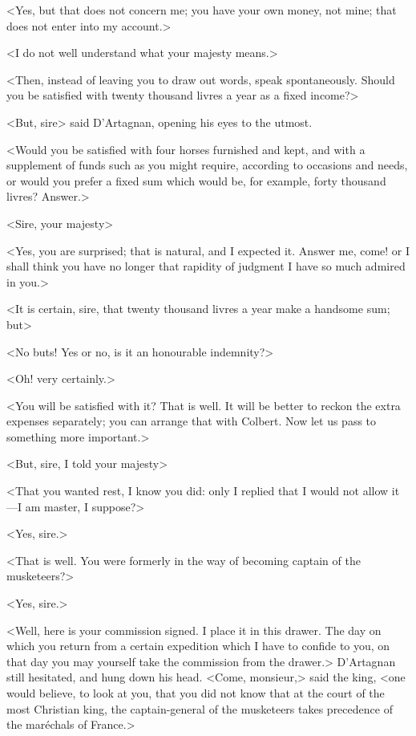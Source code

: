 <Yes, but that does not concern me; you have your own money, not mine; that does not enter into my account.>

<I do not well understand what your majesty means.>

<Then, instead of leaving you to draw out words, speak spontaneously. Should you be satisfied with twenty thousand livres a year as a fixed income?>

<But, sire> said D'Artagnan, opening his eyes to the utmost.

<Would you be satisfied with four horses furnished and kept, and with a supplement of funds such as you might require, according to occasions and needs, or would you prefer a fixed sum which would be, for example, forty thousand livres? Answer.>

<Sire, your majesty\longdash>

<Yes, you are surprised; that is natural, and I expected it. Answer me, come! or I shall think you have no longer that rapidity of judgment I have so much admired in you.>

<It is certain, sire, that twenty thousand livres a year make a handsome sum; but\longdash>

<No buts! Yes or no, is it an honourable indemnity?>

<Oh! very certainly.>

<You will be satisfied with it? That is well. It will be better to reckon the extra expenses separately; you can arrange that with Colbert. Now let us pass to something more important.>

<But, sire, I told your majesty\longdash>

<That you wanted rest, I know you did: only I replied that I would not allow it—I am master, I suppose?>

<Yes, sire.>

<That is well. You were formerly in the way of becoming captain of the musketeers?>

<Yes, sire.>

<Well, here is your commission signed. I place it in this drawer. The day on which you return from a certain expedition which I have to confide to you, on that day you may yourself take the commission from the drawer.> D'Artagnan still hesitated, and hung down his head. <Come, monsieur,> said the king, <one would believe, to look at you, that you did not know that at the court of the most Christian king, the captain-general of the musketeers takes precedence of the maréchals of France.>

